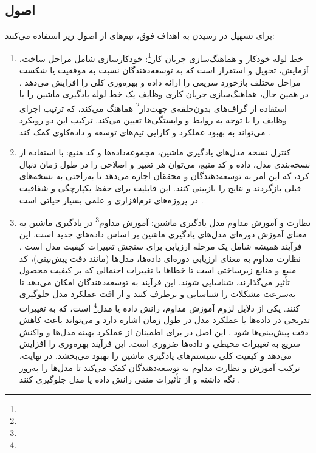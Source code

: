 \subsection{اصول}

برای تسهیل در رسیدن به اهداف فوق، تیم‌های  از اصول زیر استفاده می‌کنند:
\begin{enumerate}
	\item 
	خط لوله خودکار  و هماهنگ‌سازی جریان کار\footnote{}:
	خودکارسازی  شامل مراحل ساخت، آزمایش، تحویل و استقرار است که به توسعه‌دهندگان نسبت به موفقیت یا شکست مراحل مختلف بازخورد سریعی را ارائه داده و بهره‌وری کلی را افزایش می‌دهد \cite{MLOpsPipeline1}. در همین حال، هماهنگ‌سازی جریان کاری وظایف یک خط لوله یادگیری ماشین را با استفاده از گراف‌های بدون‌حلقه‌ی جهت‌دار\footnote{} هماهنگ می‌کند، که ترتیب اجرای وظایف را با توجه به روابط و وابستگی‌ها تعیین می‌کند. ترکیب این دو رویکرد می‌تواند به بهبود عملکرد و کارایی تیم‌های توسعه و داده‌کاوی کمک کند \cite{MLOpsWO1, MLOpsWO2}.
	\item 
	کنترل نسخه مدل‌های یادگیری ماشین، مجموعه‌داده‌ها و کد منبع:
	با استفاده از نسخه‌بندی مدل، داده و کد منبع، می‌توان هر تغییر و اصلاحی را در طول زمان دنبال کرد، که این امر به توسعه‌دهندگان و محققان اجازه می‌دهد تا به‌راحتی به نسخه‌های قبلی بازگردند و نتایج را بازبینی کنند. این قابلیت برای حفظ یکپارچگی و شفافیت در پروژه‌های نرم‌افزاری و علمی بسیار حیاتی است \cite{MLOpsPipeline1}.
	\item 
	نظارت و آموزش مداوم مدل یادگیری ماشین:
	آموزش مداوم\footnote{} در یادگیری ماشین به معنای آموزش دوره‌ای مدل‌های یادگیری ماشین بر اساس داده‌های جدید است. این فرآیند همیشه شامل یک مرحله ارزیابی برای سنجش تغییرات کیفیت مدل است \cite{MLOpsCT1}. نظارت مداوم به معنای ارزیابی دوره‌ای داده‌ها، مدل‌ها (مانند دقت پیش‌بینی)، کد منبع و منابع زیرساختی است تا خطاها یا تغییرات احتمالی که بر کیفیت محصول تأثیر می‌گذارند، شناسایی شوند. این فرآیند به توسعه‌دهندگان امکان می‌دهد تا به‌سرعت مشکلات را شناسایی و برطرف کنند و از افت عملکرد مدل جلوگیری کنند. یکی از دلایل لزوم آموزش مداوم، رانش داده یا مدل\footnote{} است، که به تغییرات تدریجی در داده‌ها یا عملکرد مدل در طول زمان اشاره دارد و می‌تواند باعث کاهش دقت پیش‌بینی‌ها شود \cite{MLOpsProd1}. این اصل در  برای اطمینان از عملکرد بهینه مدل‌ها و واکنش سریع به تغییرات محیطی و داده‌ها ضروری است. این فرآیند بهره‌وری را افزایش می‌دهد و کیفیت کلی سیستم‌های یادگیری ماشین را بهبود می‌بخشد. در نهایت، ترکیب آموزش و نظارت مداوم به توسعه‌دهندگان کمک می‌کند تا مدل‌ها را به‌روز نگه داشته و از تأثیرات منفی رانش داده یا مدل جلوگیری کنند \cite{MLOpsCT2}.

\end{enumerate}
